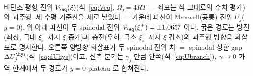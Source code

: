 \caption{비단조 평형 전위 $V_\eq(\xi)$(식~\eqref{eq:Veq}, $\Omega_j=4RT$ --- 좌표는 식 그대로의 수치
평가)와 과주행. 세 수평 기준선을 새로 넣었다 --- 가운데 파선이 Maxwell(공통) 전위 $U_j$($y{=}0$),
위$\cdot$아래 파선이 두 spinodal 전위 $V_\eq(\xi_s^\pm)={\pm}1.0657$ 이다. 굵은 경로는 방전(좌상, 극대
$\xi_s^-$ 까지 $\xi$ 증가)과 충전(우하, 극소 $\xi_s^+$ 까지 $\xi$ 감소)의 과주행 방향을 화살표로 명시한다.
오른쪽 양방향 화살표가 두 spinodal 전위 차 $=$ spinodal 상한 gap $\Delta U_j^\hys$(식~\eqref{eq:dUhys})이고,
실측 분기는 $\gamma_j$ 만큼 안쪽(식~\eqref{eq:Ubranch}), $\gamma\!\to\!0$ 가역 한계에서 두 경로가 $y{=}0$
plateau 로 합쳐진다.}
\label{fig:hysloop}
